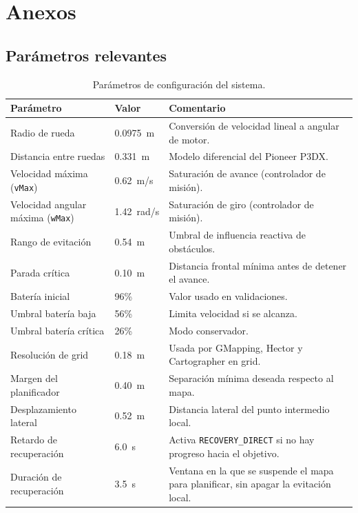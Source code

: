 \chapter{Anexos}

\section{Parámetros relevantes}

\begin{table}[H]
\small
\setlength{\tabcolsep}{3pt}
\begin{tabularx}{\textwidth}{@{}P{0.30\textwidth}P{0.18\textwidth}Y@{}}
\toprule
\textbf{Parámetro} & \textbf{Valor} & \textbf{Comentario}\\
\midrule
Radio de rueda & \SI{0.0975}{m} & Conversión de velocidad lineal a angular de motor.\\
Distancia entre ruedas & \SI{0.331}{m} & Modelo diferencial del Pioneer P3DX.\\
Velocidad máxima (\texttt{vMax}) & \SI{0.62}{m/s} & Saturación de avance (controlador de misión).\\
Velocidad angular máxima (\texttt{wMax}) & \SI{1.42}{rad/s} & Saturación de giro (controlador de misión).\\
Rango de evitación & \SI{0.54}{m} & Umbral de influencia reactiva de obstáculos.\\
Parada crítica & \SI{0.10}{m} & Distancia frontal mínima antes de detener el avance.\\
Batería inicial & 96\% & Valor usado en validaciones.\\
Umbral batería baja & 56\% & Limita velocidad si se alcanza.\\
Umbral batería crítica & 26\% & Modo conservador.\\
Resolución de grid & \SI{0.18}{m} & Usada por GMapping, Hector y Cartographer en grid.\\
Margen del planificador & \SI{0.40}{m} & Separación mínima deseada respecto al mapa.\\
Desplazamiento lateral & \SI{0.52}{m} & Distancia lateral del punto intermedio local.\\
Retardo de recuperación & \SI{6.0}{s} & Activa \texttt{RECOVERY\_DIRECT} si no hay progreso hacia el objetivo.\\
Duración de recuperación & \SI{3.5}{s} & Ventana en la que se suspende el mapa para planificar, sin apagar la evitación local.\\
\bottomrule
\end{tabularx}
\caption{Parámetros de configuración del sistema.}
\label{tab:system-params}
\end{table}

